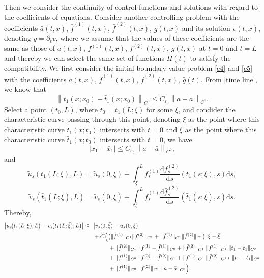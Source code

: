 \documentclass[a4paper,reqno,11pt]{amsart}
\numberwithin{equation}{section} %
\begin{document}
Then we consider the continuity of control functions and solutions with regard to the coefficients of equations.
Consider another controlling problem with the coefficients $\bar{a} (t,x)$, $\bar{f}^{(1)} (t,x)$, $\bar{f}^{(2)} (t,x)$, $\bar{g} (t,x)$ and its solution $v(t,x)$, denoting $y = \partial_t v$, where we assume that the values of these coefficients are the same as those of $a(t,x)$, $f^{(1)}(t,x)$, $f^{(2)}(t,x)$, $g(t,x)$ at $t=0$ and $t=L$ and thereby we can select the same set of functions $\widetilde{H}(t)$ to satisfy the compatibility.
We first consider the initial boundary value problem \eqref{e4} and \eqref{e5} with the coefficients $\bar{a}(t,x)$, $\bar{f}^{(1)} (t,x)$, $\bar{f}^{(2)} (t,x)$, $\bar{g} (t)$.%
From \eqref{time line}, we know that
$$
\left\| t_1\left( x;x_0 \right) -\bar{t}_1\left( x;x_0 \right) \right\| _{C^0}\leq C_{\varepsilon _0} \left\lVert a-\bar{a}\right\rVert _{C^0}.
$$
Select a point $(t_0,L)$, where $t_0=t_1\left( L;\xi \right)$ for some $\xi$, and condider the characteristic curve passing through this point, denoting $\xi$ as the point where this characteristic curve $t_1(x;t_0)$ intersects with $t=0$ and $\bar{\xi}$ as the point where this characteristic curve $\bar{t}_1(x;t_0)$ intersects with $t=0$, we have
$$
\left| x_1-\bar{x}_1 \right|\leq C_{\varepsilon _0}\left\| a-\bar{a} \right\| _{C^0},
$$
and
$$
\tilde{u}_s\left( t_1\left( L;\xi \right) ,L \right) =\tilde{u}_s(0,\xi )+\int_{\xi}^L{f_{s}^{(1)}\frac{\mathrm{d}f_{s}^{(2)}}{\mathrm{d}s}\left( t_1\left( s;\xi \right) ,s \right) \mathrm{d}s},
$$
$$
\tilde{v}_s\left( \bar{t}_1\left( L;\bar{\xi} \right) ,L \right) =\tilde{v}_s(0,\bar{\xi})+\int_{\bar{\xi} }^L{\bar{f}_{s}^{(1)}\frac{\mathrm{d}\bar{f}_{s}^{(2)}}{\mathrm{d}s}\left( \bar{t}_1\left( s;\bar{\xi} \right) ,s \right) \mathrm{d}s}.
$$
Thereby,
$$
\begin{aligned}
\bigl|\tilde u_s\!\bigl(t_1(L;\xi),L\bigr)-\tilde v_s\!\bigl(\bar t_1(L;\bar\xi),L\bigr)\bigr|
\le{}&\ \bigl|\tilde v_s(0,\bar\xi)-\tilde u_s(0,\xi)\bigr| \\
&\ + C\Bigl(
   \bigl(\|f^{(1)}\|_{C^{1}}\|f^{(2)}\|_{C^{1}}
     + \|\bar f^{(1)}\|_{C^{1}}\|\bar f^{(2)}\|_{C^{1}}\bigr)\,|\xi-\bar\xi| \Bigr.\\
&\qquad\quad
   + \|\bar f^{(2)}\|_{C^{1}}\;\|f^{(1)}-\bar f^{(1)}\|_{C^{0}}
   + \|\bar f^{(2)}\|_{C^{1}}\;\|f^{(1)}\|_{C^{1}}\;\|t_1-\bar t_1\|_{C^{0}} \\
&\qquad\quad
   + \|f^{(1)}\|_{C^{0}}\;\|f^{(2)}-\bar f^{(2)}\|_{C^{1}}
   + \|f^{(1)}\|_{C^{0}}\;\|\bar f^{(2)}\|_{C^{1,1}}\;\|t_1-\bar t_1\|_{C^{0}} \\
&\qquad\quad
   + \Bigl. \|f^{(1)}\|_{C^{0}}\;\|f^{(2)}\|_{C^{1}}\;\|a-\bar a\|_{C^{0}}
\Bigr).
\end{aligned}
$$
\end{document}
